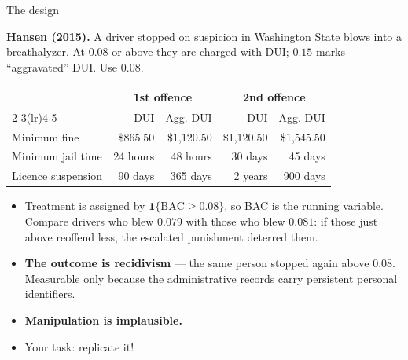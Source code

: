 \documentclass[
  11pt,
  ignorenonframetext,
  aspectratio=169,
]{beamer}
\providecommand{\tightlist}{%
  \setlength{\itemsep}{0pt}\setlength{\parskip}{0pt}}
\begin{document}
\begin{frame}{The design}
\protect{}\label{the-design}
\small

\textbf{Hansen (2015).} A driver stopped on suspicion in Washington
State blows into a breathalyzer. At \textbf{\(0.08\)} or above they are
charged with DUI; \(0.15\) marks ``aggravated'' DUI. Use \(0.08\).

\vspace{-0.4em}
\begin{center}
\scriptsize
\begin{tabular}{lrrrr}
\toprule
 & \multicolumn{2}{c}{1st offence} & \multicolumn{2}{c}{2nd offence} \\
\cmidrule(lr){2-3}\cmidrule(lr){4-5}
 & DUI & Agg. DUI & DUI & Agg. DUI \\
\midrule
Minimum fine        & \$865.50 & \$1{,}120.50 & \$1{,}120.50 & \$1{,}545.50 \\
Minimum jail time   & 24 hours & 48 hours & 30 days & 45 days \\
Licence suspension  & 90 days & 365 days & 2 years & 900 days \\
\bottomrule
\end{tabular}
\end{center}
\vspace{-0.4em}

\begin{itemize}
\tightlist
\item
  Treatment is assigned by \(\mathbf{1}\{\mathrm{BAC} \geq 0.08\}\), so
  BAC is the running variable. Compare drivers who blew \(0.079\) with
  those who blew \(0.081\): if those just above reoffend less, the
  escalated punishment deterred them.
\item
  \textbf{The outcome is recidivism} --- the same person stopped again
  above \(0.08\). Measurable only because the administrative records
  carry persistent personal identifiers.
\item
  \textbf{Manipulation is implausible.}
\item
  Your task: replicate it!
\end{itemize}
\end{frame}
\end{document}
